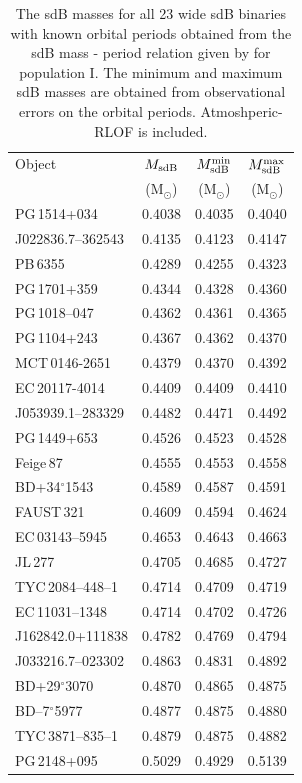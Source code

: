 \begin{table}
 \centering
   \caption{The sdB masses for all 23 wide sdB binaries with known orbital periods obtained from the sdB mass - period relation given by \citet{Chen2013} for population I. The minimum and maximum sdB masses are obtained from observational errors on the orbital periods. Atmoshperic-RLOF is included.} \label{tb:sdb_masses}
   \begin{tabular}{lccc}
   \hline\hline
   Object   &   \multicolumn{1}{c}{$M_{\rm sdB}$} &    \multicolumn{1}{c}{$M_{\rm sdB}^{\rm min}$} &   \multicolumn{1}{c}{$M_{\rm sdB}^{\rm max}$} \\
            &   \multicolumn{1}{c}{(M$_{\odot}$)} &    \multicolumn{1}{c}{(M$_{\odot}$)} &   \multicolumn{1}{c}{(M$_{\odot}$)} \\\hline
 PG\,1514+034        & 0.4038 & 0.4035 & 0.4040 \\
 J022836.7--362543   & 0.4135 & 0.4123 & 0.4147 \\
 PB\,6355            & 0.4289 & 0.4255 & 0.4323 \\
 PG\,1701+359        & 0.4344 & 0.4328 & 0.4360 \\
 PG\,1018--047       & 0.4362 & 0.4361 & 0.4365 \\
 PG\,1104+243        & 0.4367 & 0.4362 & 0.4370 \\
 MCT\,0146-2651      & 0.4379 & 0.4370 & 0.4392 \\
 EC\,20117-4014      & 0.4409 & 0.4409 & 0.4410 \\
 J053939.1--283329   & 0.4482 & 0.4471 & 0.4492 \\
 PG\,1449+653        & 0.4526 & 0.4523 & 0.4528 \\
 Feige\,87           & 0.4555 & 0.4553 & 0.4558 \\
 BD+34$^{\circ}$1543 & 0.4589 & 0.4587 & 0.4591 \\
 FAUST\,321          & 0.4609 & 0.4594 & 0.4624 \\
 EC\,03143--5945     & 0.4653 & 0.4643 & 0.4663 \\
 JL\,277             & 0.4705 & 0.4685 & 0.4727 \\
 TYC\,2084--448–1    & 0.4714 & 0.4709 & 0.4719 \\
 EC\,11031--1348     & 0.4714 & 0.4702 & 0.4726 \\
 J162842.0+111838    & 0.4782 & 0.4769 & 0.4794 \\
 J033216.7--023302   & 0.4863 & 0.4831 & 0.4892 \\
 BD+29$^{\circ}$3070 & 0.4870 & 0.4865 & 0.4875 \\
 BD--7$^{\circ}$5977 & 0.4877 & 0.4875 & 0.4880 \\
 TYC\,3871--835--1   & 0.4879 & 0.4875 & 0.4882 \\
 PG\,2148+095        & 0.5029 & 0.4929 & 0.5139 \\
   \hline
   \end{tabular}
\end{table}

